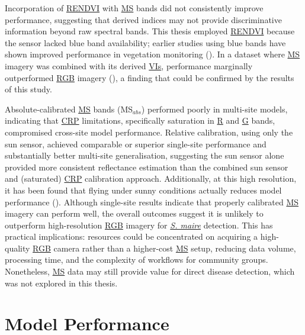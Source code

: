 \documentclass[
]{scrreprt}
\begin{document}
Incorporation of \hyperref[acronyms_RENDVI]{RENDVI} with
\hyperref[acronyms_MS]{MS} bands did not consistently improve
performance, suggesting that derived indices may not provide
discriminative information beyond raw spectral bands. This thesis
employed \hyperref[acronyms_RENDVI]{RENDVI} because the sensor lacked
blue band availability; earlier studies using blue bands have shown
improved performance in vegetation monitoring
(). In a
dataset where \hyperref[acronyms_MS]{MS} imagery was combined with its
derived \hyperref[acronyms_VI]{VIs}, performance marginally outperformed
\hyperref[acronyms_RGB]{RGB} imagery
(), a finding that
could be confirmed by the results of this study.

Absolute-calibrated \hyperref[acronyms_MS]{MS} bands (MS\(_{abs}\))
performed poorly in multi-site models, indicating that
\hyperref[acronyms_CRP]{CRP} limitations, specifically saturation in
\hyperref[acronyms_R]{R} and \hyperref[acronyms_G]{G} bands, compromised
cross-site model performance. Relative calibration, using only the sun
sensor, achieved comparable or superior single-site performance and
substantially better multi-site generalisation, suggesting the sun
sensor alone provided more consistent reflectance estimation than the
combined sun sensor and (saturated) \hyperref[acronyms_CRP]{CRP}
calibration approach. Additionally, at this high resolution, it has been
found that flying under sunny conditions actually reduces model
performance (). Although single-site results indicate that properly calibrated
\hyperref[acronyms_MS]{MS} imagery can perform well, the overall
outcomes suggest it is unlikely to outperform high-resolution
\hyperref[acronyms_RGB]{RGB} imagery for \hyperref[acronyms_SM]{\emph{S.
maire}} detection. This has practical implications: resources could be
concentrated on acquiring a high-quality \hyperref[acronyms_RGB]{RGB}
camera rather than a higher-cost \hyperref[acronyms_MS]{MS} setup,
reducing data volume, processing time, and the complexity of workflows
for community groups. Nonetheless, \hyperref[acronyms_MS]{MS} data may
still provide value for direct disease detection, which was not explored
in this thesis.

\section{Model Performance}\label{model-performance}
\end{document}

